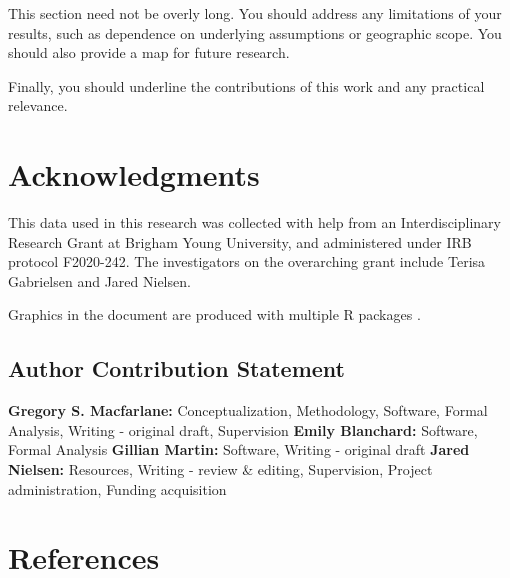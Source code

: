 \documentclass[
  letterpaper,
  authoryear]{elsarticle}
\begin{document}
This section need not be overly long. You should address any limitations
of your results, such as dependence on underlying assumptions or
geographic scope. You should also provide a map for future research.

Finally, you should underline the contributions of this work and any
practical relevance.


\hypertarget{acknowledgments}{%
\section*{Acknowledgments}\label{acknowledgments}}


This data used in this research was collected with help from an
Interdisciplinary Research Grant at Brigham Young University, and
administered under IRB protocol F2020-242. The investigators on the
overarching grant include Terisa Gabrielsen and Jared Nielsen.

Graphics in the document are produced with multiple R packages
\citep{modelsummary, ggplot2, ggspatial, wesanderson}.

\hypertarget{author-contribution-statement}{%
\subsection*{Author Contribution
Statement}\label{author-contribution-statement}}


\textbf{Gregory S. Macfarlane:} Conceptualization, Methodology,
Software, Formal Analysis, Writing - original draft, Supervision
\textbf{Emily Blanchard:} Software, Formal Analysis \textbf{Gillian
Martin:} Software, Writing - original draft \textbf{Jared Nielsen:}
Resources, Writing - review \& editing, Supervision, Project
administration, Funding acquisition


\hypertarget{references}{%
\section*{References}\label{references}}


\renewcommand{\bibsection}{}

\end{document}
